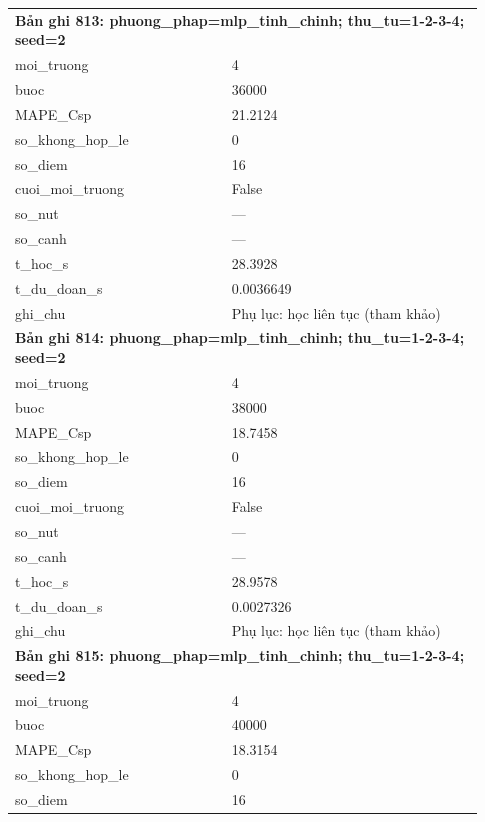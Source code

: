 \begin{longtable}{p{0.43\linewidth}p{0.50\linewidth}}
\midrule
\multicolumn{2}{p{0.95\linewidth}}{\textbf{Bản ghi 813: phuong\_phap=mlp\_tinh\_chinh; thu\_tu=1-2-3-4; seed=2}} \\
moi\_\allowbreak truong & 4 \\
buoc & 36000 \\
MAPE\_\allowbreak Csp & 21.2124 \\
so\_\allowbreak khong\_\allowbreak hop\_\allowbreak le & 0 \\
so\_\allowbreak diem & 16 \\
cuoi\_\allowbreak moi\_\allowbreak truong & False \\
so\_\allowbreak nut & — \\
so\_\allowbreak canh & — \\
t\_\allowbreak hoc\_\allowbreak s & 28.3928 \\
t\_\allowbreak du\_\allowbreak doan\_\allowbreak s & 0.0036649 \\
ghi\_\allowbreak chu & Phụ lục: học liên tục (tham khảo) \\
\midrule
\multicolumn{2}{p{0.95\linewidth}}{\textbf{Bản ghi 814: phuong\_phap=mlp\_tinh\_chinh; thu\_tu=1-2-3-4; seed=2}} \\
moi\_\allowbreak truong & 4 \\
buoc & 38000 \\
MAPE\_\allowbreak Csp & 18.7458 \\
so\_\allowbreak khong\_\allowbreak hop\_\allowbreak le & 0 \\
so\_\allowbreak diem & 16 \\
cuoi\_\allowbreak moi\_\allowbreak truong & False \\
so\_\allowbreak nut & — \\
so\_\allowbreak canh & — \\
t\_\allowbreak hoc\_\allowbreak s & 28.9578 \\
t\_\allowbreak du\_\allowbreak doan\_\allowbreak s & 0.0027326 \\
ghi\_\allowbreak chu & Phụ lục: học liên tục (tham khảo) \\
\midrule
\multicolumn{2}{p{0.95\linewidth}}{\textbf{Bản ghi 815: phuong\_phap=mlp\_tinh\_chinh; thu\_tu=1-2-3-4; seed=2}} \\
moi\_\allowbreak truong & 4 \\
buoc & 40000 \\
MAPE\_\allowbreak Csp & 18.3154 \\
so\_\allowbreak khong\_\allowbreak hop\_\allowbreak le & 0 \\
so\_\allowbreak diem & 16 \\

\end{longtable}
